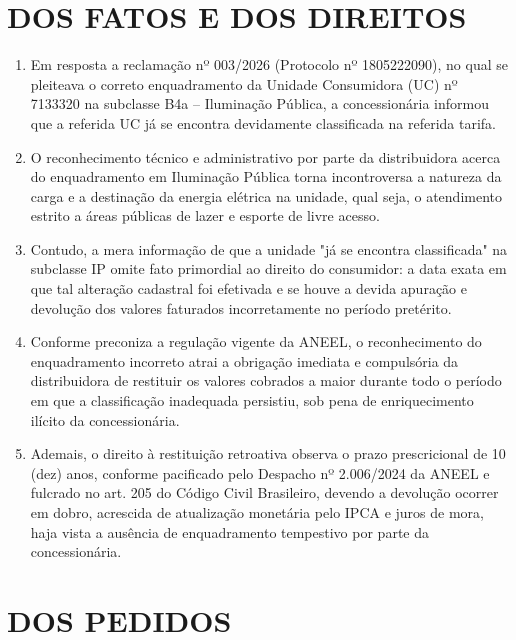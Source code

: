 \newcommand{\tipoRequerimento}{Cobrança indevida sobre enquadramento tarifário incorreto}
\section{DOS FATOS E DOS DIREITOS}

\begin{enumerate}
    \item Em resposta a reclamação nº 003/2026 (Protocolo nº 1805222090), no qual se pleiteava o correto enquadramento da Unidade Consumidora (UC) nº 7133320 na subclasse B4a -- Iluminação Pública, a concessionária informou que a referida UC já se encontra devidamente classificada na referida tarifa.
    
    \item O reconhecimento técnico e administrativo por parte da distribuidora acerca do enquadramento em Iluminação Pública torna incontroversa a natureza da carga e a destinação da energia elétrica na unidade, qual seja, o atendimento estrito a áreas públicas de lazer e esporte de livre acesso.
    
    \item Contudo, a mera informação de que a unidade "já se encontra classificada" na subclasse IP omite fato primordial ao direito do consumidor: a data exata em que tal alteração cadastral foi efetivada e se houve a devida apuração e devolução dos valores faturados incorretamente no período pretérito.
    
    \item Conforme preconiza a regulação vigente da ANEEL, o reconhecimento do enquadramento incorreto atrai a obrigação imediata e compulsória da distribuidora de restituir os valores cobrados a maior durante todo o período em que a classificação inadequada persistiu, sob pena de enriquecimento ilícito da concessionária.
    
    \item Ademais, o direito à restituição retroativa observa o prazo prescricional de 10 (dez) anos, conforme pacificado pelo Despacho nº 2.006/2024 da ANEEL e fulcrado no art. 205 do Código Civil Brasileiro, devendo a devolução ocorrer em dobro, acrescida de atualização monetária pelo IPCA e juros de mora, haja vista a ausência de enquadramento tempestivo por parte da concessionária.
\end{enumerate}

\section{DOS PEDIDOS}

